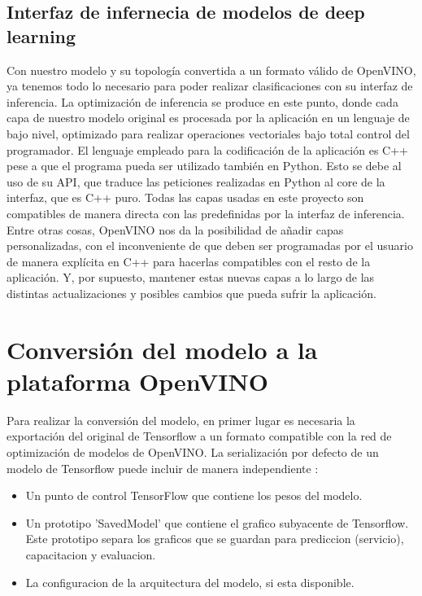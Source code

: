 \subsection{Interfaz de infernecia de modelos de deep learning}\label{subsec:interfaz-de-infernecia-de-modelos-de-deep-learning}
Con nuestro modelo y su topología convertida a un formato válido de OpenVINO, ya tenemos todo lo necesario para poder realizar clasificaciones con su interfaz de inferencia\@.
La optimización de inferencia se produce en este punto, donde cada capa de nuestro modelo original es procesada por la aplicación en un lenguaje de bajo nivel, optimizado para realizar operaciones vectoriales bajo total control del programador.
El lenguaje empleado para la codificación de la aplicación es C++ pese a que el programa pueda ser utilizado también en Python.
Esto se debe al uso de su API, que traduce las peticiones realizadas en Python al core de la interfaz, que es C++ puro.
Todas las capas usadas en este proyecto son compatibles de manera directa con las predefinidas por la interfaz de inferencia.
Entre otras cosas, OpenVINO nos da la posibilidad de añadir capas personalizadas, con el inconveniente de que deben ser programadas por el usuario de manera explícita en C++ para hacerlas compatibles con el resto de la aplicación.
Y, por supuesto, mantener estas nuevas capas a lo largo de las distintas actualizaciones y posibles cambios que pueda sufrir la aplicación.


\section{Conversión del modelo a la plataforma OpenVINO}\label{sec:conversión-del-modelo-a-la-plataforma-OpenVINO}
Para realizar la conversión del modelo, en primer lugar es necesaria la exportación del original de Tensorflow a un formato compatible con la red de optimización de modelos de OpenVINO\@.
La serialización por defecto de un modelo de Tensorflow puede incluir de manera independiente :

\begin{itemize}
    \item Un punto de control TensorFlow que contiene los pesos del modelo.
    \item Un prototipo 'SavedModel' que contiene el grafico subyacente de Tensorflow.
    Este prototipo separa los graficos que se guardan para prediccion (servicio), capacitacion y evaluacion.
    \item La configuracion de la arquitectura del modelo, si esta disponible.
\end{itemize}

